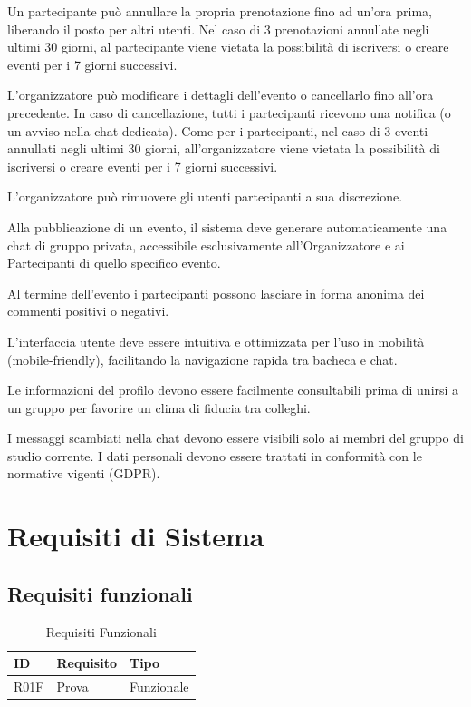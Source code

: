 \documentclass[12pt,a4paper]{report}
\begin{document}
Un partecipante può annullare la propria prenotazione fino ad un’ora prima, liberando il posto per altri utenti. Nel caso di 3 prenotazioni annullate negli ultimi 30 giorni, al partecipante viene vietata la possibilità di iscriversi o creare eventi per i 7 giorni successivi.

L'organizzatore può modificare i dettagli dell'evento o cancellarlo fino all’ora precedente. In caso di cancellazione, tutti i partecipanti ricevono una notifica (o un avviso nella chat dedicata). Come per i partecipanti, nel caso di 3 eventi annullati negli ultimi 30 giorni, all’organizzatore viene vietata la possibilità di iscriversi o creare eventi per i 7 giorni successivi.

L’organizzatore può rimuovere gli utenti partecipanti a sua discrezione.

Alla pubblicazione di un evento, il sistema deve generare automaticamente una chat di gruppo privata, accessibile esclusivamente all'Organizzatore e ai Partecipanti di quello specifico evento.

Al termine dell’evento i partecipanti possono lasciare in forma anonima dei commenti positivi o negativi.

L'interfaccia utente deve essere intuitiva e ottimizzata per l'uso in mobilità (mobile-friendly), facilitando la navigazione rapida tra bacheca e chat.

Le informazioni del profilo devono essere facilmente consultabili prima di unirsi a un gruppo per favorire un clima di fiducia tra colleghi.

I messaggi scambiati nella chat devono essere visibili solo ai membri del gruppo di studio corrente. I dati personali devono essere trattati in conformità con le normative vigenti (GDPR).

\section{Requisiti di Sistema}

\subsection{Requisiti funzionali}
\begin{table}[H]
    \centering
    \begin{tabularx}{\textwidth}{|l|X|l|}
        \hline
        \textbf{ID} & \textbf{Requisito} & \textbf{Tipo} \\ \hline
        R01F & Prova & Funzionale \\ \hline
    \end{tabularx}
    \caption{Requisiti Funzionali}
\end{table}
\end{document}
